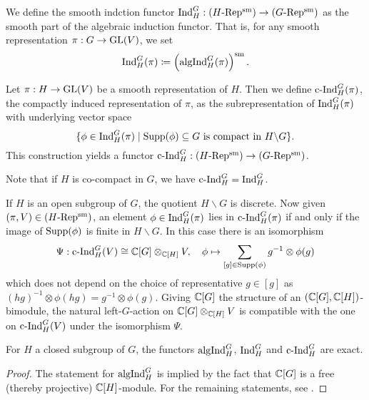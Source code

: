\documentclass[../main.tex]{subfiles}
\begin{document}
\begin{defi}\label{def:SmoothInduction}
  We define the smooth indction functor $\mathrm{Ind}_H^G: {({H}\text-\allowbreak\mathrm{Rep^{\mathrm{sm}}})} \to {({G}\text-\allowbreak\mathrm{Rep^{\mathrm{sm}}})}$ as 
  the smooth part of the algebraic induction functor. That is, for any smooth
  representation $\pi: G \to \operatorname{GL}(V)$, we set
  \begin{equation*}
    \mathrm{Ind}_H^G(\pi) \coloneqq \left(\mathrm{algInd}_H^G(\pi)\right)^{\mathrm{sm}}.
  \end{equation*}
  \end{defi}

\begin{defi}\label{def:CompactInduction}
  Let $\pi: H \to \operatorname{GL}(V)$ be a smooth representation
  of $H$. Then we define $\mathrm{c\text{-}Ind}_H^G(\pi)$, the compactly induced representation
  of $\pi$, as the subrepresentation of $\mathrm{Ind}_H^G(\pi)$ with underlying vector
  space
  \begin{equation*}
    \{\phi \in \mathrm{Ind}_H^G(\pi) \mid \operatorname{Supp}(\phi) \subseteq G \text{ is compact in }
    H\backslash G\}.
  \end{equation*}
  This construction yields a functor $\mathrm{c\text{-}Ind}_H^G: {({H}\text-\allowbreak\mathrm{Rep^{\mathrm{sm}}})} \to {({G}\text-\allowbreak\mathrm{Rep^{\mathrm{sm}}})}$. 
\end{defi}
Note that if $H$ is co-compact in $G$, we have $\mathrm{c\text{-}Ind}_H^G = \mathrm{Ind}_H^G$. 

\begin{rmk} 
  If $H$ is an open subgroup of $G$, the quotient $H \backslash G$ is 
  discrete. Now given $(\pi, V) \in {({H}\text-\allowbreak\mathrm{Rep^{\mathrm{sm}}})}$, an element $\phi \in \mathrm{Ind}_H^G(\pi)$
  lies in $\mathrm{c\text{-}Ind}_H^G(\pi)$ if and only if 
  the image of $\operatorname{Supp}(\phi)$ is finite in $H \backslash G$. 
  In this case there is an isomorphism
  \begin{equation}\label{eq:cIndTensorExpr}
    \Psi: \mathrm{c\text{-}Ind}_H^G(V) \cong \mathbb{C}[G] \otimes_{\mathbb{C}[H]} V, \quad \phi \mapsto \sum_{[g]
    \in \operatorname{Supp}(\phi)} g^{-1} \otimes \phi(g)
  \end{equation}
  which does not depend on the choice of representative $g \in [g]$ as 
  $(hg)^{-1} \otimes \phi(hg) = g^{-1} \otimes \phi(g)$. 
  Giving $\mathbb{C}[G]$ the structure of an $(\mathbb{C}[G], \mathbb{C}[H])$-bimodule, the natural
  left-$G$-action on $\mathbb{C}[G] \otimes_{\mathbb{C}[H]} V$ is compatible with the one 
  on $\mathrm{c\text{-}Ind}_H^G(V)$ under the isomorphism $\Psi$. 
\end{rmk}

\begin{prop}\label{prop:InducedRepresentationExact}
  For $H$ a closed subgroup of $G$, the functors $\mathrm{algInd}_H^G$, $\mathrm{Ind}_H^G$ and
  $\mathrm{c\text{-}Ind}_H^G$  are exact. 
  \begin{proof}
    The statement for $\mathrm{algInd}_H^G$ is implied by the fact that 
    $\mathbb{C}[G]$ is a free (thereby projective) $\mathbb{C}[H]$-module. For the remaining statements,
    see \cite[p. 18f]{bushnell2006local}.
  \end{proof}
\end{prop}
\end{document}
